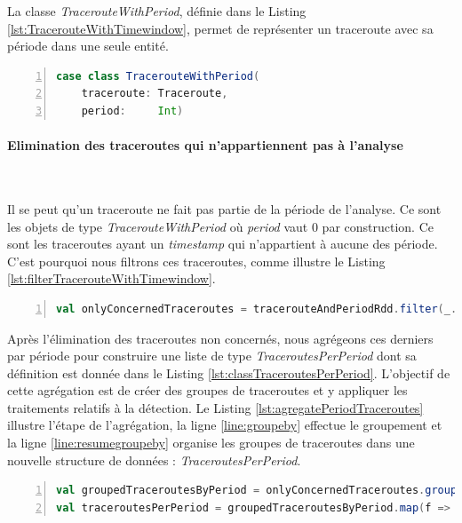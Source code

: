 La  classe \textit{TracerouteWithPeriod}, définie dans le Listing \ref{lst:TracerouteWithTimewindow}, permet de représenter un traceroute avec sa période dans une seule entité. 
\begin{lstlisting}[language=scala,firstnumber=1, caption={Définition de la classe TracerouteWithPeriod },label={lst:TracerouteWithTimewindow}, basicstyle = \footnotesize,escapechar=|,numbers=left,
stepnumber=1]
case class TracerouteWithPeriod(
	traceroute: Traceroute,
	period:     Int)
\end{lstlisting}

\paragraph{Elimination des traceroutes qui n'appartiennent pas à l'analyse}~

Il se peut qu'un traceroute ne fait pas partie de la période de l'analyse. Ce sont les objets de type \textit{TracerouteWithPeriod}  où  \textit{period} vaut $0$ par construction. Ce sont les traceroutes ayant un   \textit{timestamp}  qui n'appartient à aucune des période. C'est pourquoi nous filtrons ces traceroutes, comme  illustre le Listing  \ref{lst:filterTracerouteWithTimewindow}.

\begin{lstlisting}[language=scala,firstnumber=1, caption={Elimination des traceroutes non concernés par l'analyse },label={lst:filterTracerouteWithTimewindow}, basicstyle = \footnotesize,escapechar=|,numbers=left,
stepnumber=1]
val onlyConcernedTraceroutes = tracerouteAndPeriodRdd.filter(_.period != 0)
\end{lstlisting}

Après l'élimination des traceroutes non concernés, nous agrégeons ces derniers par période pour construire une liste de type   \textit{TraceroutesPerPeriod} dont sa définition est  donnée dans le Listing \ref{lst:classTraceroutesPerPeriod}. 
L'objectif de cette agrégation est de créer des groupes de traceroutes et y  appliquer les traitements relatifs à la détection. 
Le Listing \ref{lst:agregatePeriodTraceroutes} illustre l'étape de l'agrégation, la ligne 
\ref{line:groupeby} effectue le groupement et la ligne \ref{line:resumegroupeby} organise les groupes de traceroutes dans une nouvelle structure de données : \textit{TraceroutesPerPeriod}.

\begin{lstlisting}[language=scala,firstnumber=1, caption={Le groupement des traceroutes par période},label={lst:agregatePeriodTraceroutes}, basicstyle = \footnotesize,escapechar=|,numbers=left,
stepnumber=1]
val groupedTraceroutesByPeriod = onlyConcernedTraceroutes.groupBy(_.period)|\label{line:groupeby}|
val traceroutesPerPeriod = groupedTraceroutesByPeriod.map(f => TraceroutesPerPeriod(f._2.map(twp => twp.traceroute).toSeq, f._1)) |\label{line:resumegroupeby}|
\end{lstlisting}


